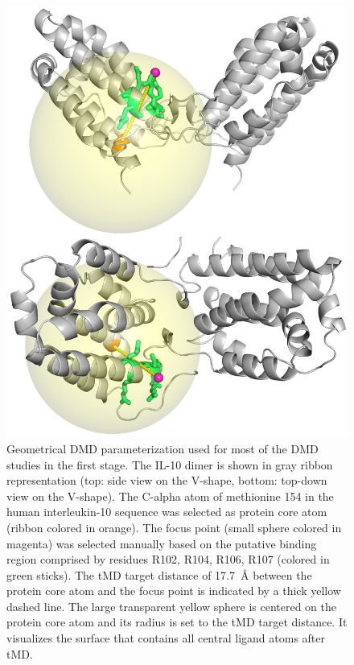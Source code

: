 \begin{figure}
\centering
\includegraphics[width=1.0\textwidth]{gfx/dmdil10/round1_il10_ligandcenter_proteincore_sphere_top_and_side_001.jpg}
\caption[]{Geometrical DMD parameterization used for most of the DMD studies
in the first stage. The IL-10 dimer is shown in gray ribbon representation (top:
side view on the V-shape, bottom: top-down view on the V-shape). The C-alpha
atom of methionine 154 in the human interleukin-10 sequence was selected as
protein core atom (ribbon colored in orange). The focus point (small sphere
colored in magenta) was selected manually based on the putative binding region
comprised by residues R102, R104, R106, R107 (colored in green sticks). The tMD
target distance of \SI{17.7}{\angstrom} between the protein core atom and the
focus point is indicated by a thick yellow dashed line. The large transparent
yellow sphere is centered on the protein core atom and its radius is set to the
tMD target distance. It visualizes the surface that contains all central ligand
atoms after tMD.}
\label{fig:dmdil10:dmd_geometry_round1}
\end{figure}

